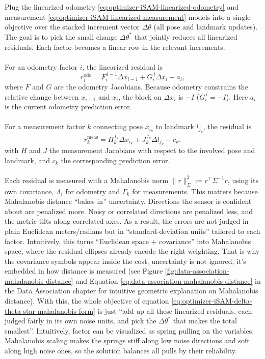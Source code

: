 \\ \\
Plug the linearized odometry \eqref{eq:optimizer-iSAM-linearized-odometry} and measurement \eqref{eq:optimizer-iSAM-linearized-measurement} models into a single objective over the stacked increment vector $\Delta\theta$ (all pose and landmark updates). The goal is to pick the small change $\Delta\theta^{*}$ that jointly reduces all linearized residuals. Each factor becomes a linear row in the relevant increments. 
\\ \\
For an odometry factor $i$, the linearized residual is
$$
    r_i^{\text{odo}}=F_i^{\,i-1}\Delta x_{i-1}+G_i^{\,i}\Delta x_i-a_i,
$$
where $F$ and $G$ are the odometry Jacobians. Because odometry constrains the relative change between $x_{i-1}$ and $x_i$, the block on $\Delta x_i$ is $-I$ ($G_i^{\,i}=-I$). Here $a_i$ is the current odometry prediction error.
\\ \\
For a measurement factor $k$ connecting pose $x_{i_k}$ to landmark $l_{j_k}$, the residual is
$$
    r_k^{\text{meas}}=H_k^{\,i_k}\Delta x_{i_k}+J_k^{\,j_k}\Delta l_{j_k}-c_k,
$$
with $H$ and $J$ the measurement Jacobians with respect to the involved pose and landmark, and $c_k$ the corresponding prediction error.
\\ \\
Each residual is measured with a Mahalanobis norm $\|r\|_{\Sigma}^2 := r^\top \Sigma^{-1} r$, using its own covariance, $\Lambda_i$ for odometry and $\Gamma_k$ for measurements. This matters because Mahalanobis distance ``bakes in'' uncertainty. Directions the sensor is confident about are penalized more. Noisy or correlated directions are penalized less, and the metric tilts along correlated axes. As a result, the errors are not judged in plain Euclidean meters/radians but in ``standard-deviation units'' tailored to each factor. Intuitively, this turns ``Euclidean space + covariance'' into Mahalanobis space, where the residual ellipses already encode the right weighting. That is why the covariance symbols appear inside the cost, uncertainty is not ignored, it's embedded in how distance is measured (see Figure \ref{fig:data-association-mahalanobis-distance} and Equation \eqref{eq:data-association-mahalanobis-distance} in the Data Association chapter for intuitive geometric explanation on Mahalanobis distance). With this, the whole objective of equation \eqref{eq:optimizer-iSAM-delta-theta-star-mahalanobis-form} is just ``add up all these linearized residuals, each judged fairly in its own noise units, and pick the $\Delta\theta^{*}$ that makes the total smallest''. Intuitively, factor can be visualized as spring pulling on the variables. Mahalanobis scaling makes the springs stiff along low noise directions and soft along high noise ones, so the solution balances all pulls by their reliability.
